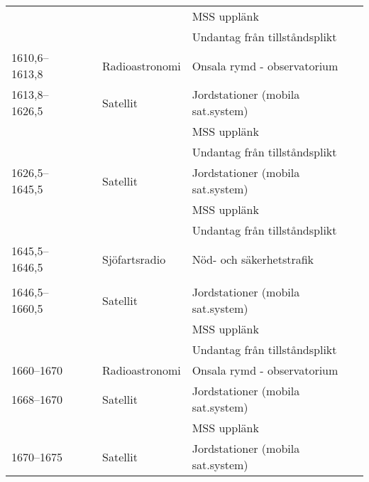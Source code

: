 \begin{landscape}
\begin{landscape}
\begin{longtable}{llll}
	                   &                    &                         & MSS upplänk                           \\
	                   &                    &                         & Undantag från tillståndsplikt         \\
	1610,6--1613,8     &                    & Radioastronomi          & Onsala rymd - observatorium           \\
	1613,8--1626,5     &                    & Satellit                & Jordstationer (mobila sat.system)     \\
	                   &                    &                         & MSS upplänk                           \\
	                   &                    &                         & Undantag från tillståndsplikt         \\
	1626,5--1645,5     &                    & Satellit                & Jordstationer (mobila sat.system)     \\
	                   &                    &                         & MSS upplänk                           \\
	                   &                    &                         & Undantag från tillståndsplikt         \\
	1645,5--1646,5     &                    & Sjöfartsradio           & Nöd- och säkerhetstrafik              \\
	                   &                    &                         &                                       \\
	1646,5--1660,5     &                    & Satellit                & Jordstationer (mobila sat.system)     \\
	                   &                    &                         & MSS upplänk                           \\
	                   &                    &                         & Undantag från tillståndsplikt         \\
	1660--1670         &                    & Radioastronomi          & Onsala rymd - observatorium           \\
	1668--1670         &                    & Satellit                & Jordstationer (mobila sat.system)     \\
	                   &                    &                         & MSS upplänk                           \\
	1670--1675         &                    & Satellit                & Jordstationer (mobila sat.system)     \\

\end{longtable}
\end{landscape}
\end{landscape}
